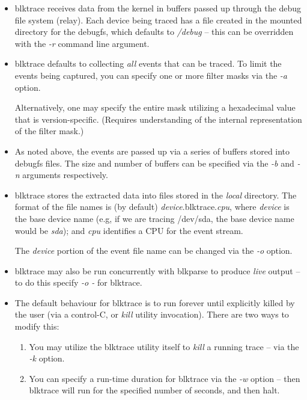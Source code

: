 \documentclass{article}
\begin{document}
\begin{itemize}
  \item blktrace receives data from the kernel in buffers passed up
  through the debug file system (relay). Each device being traced has
  a file created in the mounted directory for the debugfs, which defaults
  to \emph{/debug} -- this can be overridden with the \emph{-r} command
  line argument.
  
  \item blktrace defaults to collecting \emph{all} events that can be
  traced. To limit the events being captured, you can specify one or
  more filter masks via the \emph{-a} option.

  Alternatively, one may specify the entire mask utilizing a hexadecimal
  value that is version-specific. (Requires understanding of the internal
  representation of the filter mask.)

  \item As noted above, the events are passed up via a series of buffers
  stored into debugfs files. The size and number of buffers can be
  specified via the \emph{-b} and \emph{-n} arguments respectively.

  \item blktrace stores the extracted data into files stored in the
  \emph{local} directory. The format of the file names is (by default)
  \emph{device}.blktrace.\emph{cpu}, where \emph{device} is the base
  device name (e.g, if we are tracing /dev/sda, the base device name would
  be \emph{sda}); and \emph{cpu} identifies a CPU for the event stream.

  The \emph{device} portion of the event file name can be changed via
  the \emph{-o} option.

  \item blktrace may also be run concurrently with blkparse to produce
  \emph{live} output -- to do this specify \emph{-o -} for blktrace.

  \item The default behaviour for blktrace is to run forever until explicitly killed by the user (via a control-C, or \emph{kill} utility invocation). There are two ways to modify this: 

  \begin{enumerate}
    \item You may utilize the blktrace utility itself to \emph{kill}
    a running trace -- via the \emph{-k} option.

    \item You can specify a run-time duration for blktrace via the
    \emph{-w} option -- then blktrace will run for the specified number
    of seconds, and then halt.
  \end{enumerate}
\end{itemize}
\end{document}
